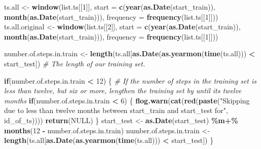 \documentclass[
]{article}
\newenvironment{Shaded}{\begin{snugshade}}{\end{snugshade}}
\newcommand{\AttributeTok}[1]{\textcolor[rgb]{0.13,0.29,0.53}{#1}}
\newcommand{\CommentTok}[1]{\textcolor[rgb]{0.56,0.35,0.01}{\textit{#1}}}
\newcommand{\ConstantTok}[1]{\textcolor[rgb]{0.56,0.35,0.01}{#1}}
\newcommand{\ControlFlowTok}[1]{\textcolor[rgb]{0.13,0.29,0.53}{\textbf{#1}}}
\newcommand{\DecValTok}[1]{\textcolor[rgb]{0.00,0.00,0.81}{#1}}
\newcommand{\FunctionTok}[1]{\textcolor[rgb]{0.13,0.29,0.53}{\textbf{#1}}}
\newcommand{\NormalTok}[1]{#1}
\newcommand{\OtherTok}[1]{\textcolor[rgb]{0.56,0.35,0.01}{#1}}
\newcommand{\SpecialCharTok}[1]{\textcolor[rgb]{0.81,0.36,0.00}{\textbf{#1}}}
\newcommand{\StringTok}[1]{\textcolor[rgb]{0.31,0.60,0.02}{#1}}
\begin{document}
\begin{Shaded}
\begin{Highlighting}[]
\NormalTok{  ts.all }\OtherTok{\textless{}{-}} \FunctionTok{window}\NormalTok{(list.ts[[}\DecValTok{1}\NormalTok{]], }\AttributeTok{start =} \FunctionTok{c}\NormalTok{(}\FunctionTok{year}\NormalTok{(}\FunctionTok{as.Date}\NormalTok{(start\_train)), }\FunctionTok{month}\NormalTok{(}\FunctionTok{as.Date}\NormalTok{(start\_train))), }\AttributeTok{frequency =} \FunctionTok{frequency}\NormalTok{(list.ts[[}\DecValTok{1}\NormalTok{]]))}
\NormalTok{  ts.all.original }\OtherTok{\textless{}{-}} \FunctionTok{window}\NormalTok{(list.ts[[}\DecValTok{2}\NormalTok{]], }\AttributeTok{start =} \FunctionTok{c}\NormalTok{(}\FunctionTok{year}\NormalTok{(}\FunctionTok{as.Date}\NormalTok{(start\_train)), }\FunctionTok{month}\NormalTok{(}\FunctionTok{as.Date}\NormalTok{(start\_train))), }\AttributeTok{frequency =} \FunctionTok{frequency}\NormalTok{(list.ts[[}\DecValTok{1}\NormalTok{]]))}
  
\NormalTok{  number.of.steps.in.train }\OtherTok{\textless{}{-}} \FunctionTok{length}\NormalTok{(ts.all[}\FunctionTok{as.Date}\NormalTok{(}\FunctionTok{as.yearmon}\NormalTok{(}\FunctionTok{time}\NormalTok{(ts.all))) }\SpecialCharTok{\textless{}}\NormalTok{ start\_test]) }\CommentTok{\# The length of our training set.}
  
  \ControlFlowTok{if}\NormalTok{(number.of.steps.in.train }\SpecialCharTok{\textless{}} \DecValTok{12}\NormalTok{) \{ }\CommentTok{\# If the number of steps in the training set is less than twelve, but six or more, lengthen the training set by until it\textquotesingle{}s twelve months}
    \ControlFlowTok{if}\NormalTok{(number.of.steps.in.train }\SpecialCharTok{\textless{}} \DecValTok{6}\NormalTok{) \{}
      \FunctionTok{flog.warn}\NormalTok{(}\FunctionTok{cat}\NormalTok{(}\FunctionTok{red}\NormalTok{(}\FunctionTok{paste}\NormalTok{(}\StringTok{"Skipping due to less than twelve months between start\_train and start\_test for"}\NormalTok{, id\_of\_ts))))}
      \FunctionTok{return}\NormalTok{(}\ConstantTok{NULL}\NormalTok{)}
\NormalTok{    \}}
\NormalTok{    start\_test }\OtherTok{\textless{}{-}} \FunctionTok{as.Date}\NormalTok{(start\_test) }\SpecialCharTok{\%m+\%} \FunctionTok{months}\NormalTok{(}\DecValTok{12} \SpecialCharTok{{-}}\NormalTok{ number.of.steps.in.train)    }
\NormalTok{    number.of.steps.in.train }\OtherTok{\textless{}{-}} \FunctionTok{length}\NormalTok{(ts.all[}\FunctionTok{as.Date}\NormalTok{(}\FunctionTok{as.yearmon}\NormalTok{(}\FunctionTok{time}\NormalTok{(ts.all))) }\SpecialCharTok{\textless{}}\NormalTok{ start\_test])}
\NormalTok{  \}}
  

\end{Highlighting}
\end{Shaded}
\end{document}
